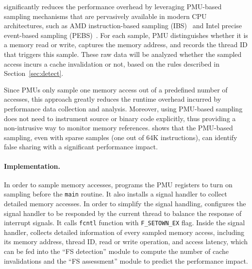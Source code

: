 \cheetah{} significantly reduces the performance overhead by leveraging PMU-based sampling mechanisms that are pervasively available in modern CPU architectures, such as AMD instruction-based sampling (IBS)~\cite{AMDIBS:07} and Intel precise event-based sampling (PEBS)~\cite{IntelArch:PEBS:Sept09}. For each sample, PMU distinguishes whether it is a memory read or write, captures the memory address, and records the thread ID that triggers this sample. These raw data will be analyzed whether the sampled access incurs a cache invalidation or not, based on the rules described in Section~\ref{sec:detect}.

Since PMUs only sample one memory access out of a predefined number of accesses, this approach greatly reduces the runtime overhead incurred by performance data collection and analysis. Moreover, using PMU-based sampling does not need to instrument source or binary code explicitly, thus providing a non-intrusive way to monitor memory references. \cheetah{} shows that the PMU-based sampling, even with sparse samples (one out of 64K instructions), can identify false sharing with a significant performance impact.
 

\paragraph{Implementation.} 

In order to sample memory accesses, \cheetah{} programs the PMU registers to turn on sampling before the \texttt{main} routine. It also installs a signal handler to collect detailed memory accesses. In order to simplify the signal handling, \Cheetah{} configures the signal handler to be responded by the current thread to balance the response of interrupt signals. It calls \texttt{fcntl} function with \texttt{F\_SETOWN\_EX} flag. Inside the signal handler, \Cheetah{} collects detailed information of every sampled memory access, including its memory address, thread ID, read or write operation, and access latency, which can be fed into the ``FS detection'' module to compute the number of cache invalidations and the ``FS assessment'' module to predict the performance impact.

